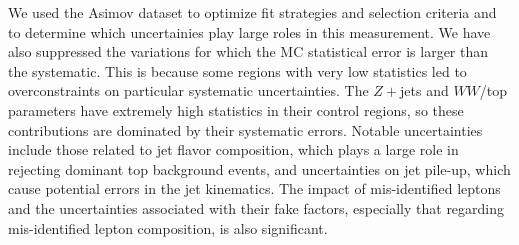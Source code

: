 
We used the Asimov dataset to optimize fit strategies and selection criteria and to determine which uncertainies play large roles in this measurement. We have also suppressed the variations for which the MC statistical error is larger than the systematic. This is because some regions with very low statistics led to overconstraints on particular systematic uncertainties. The $Z+$jets and $WW$/top parameters have extremely high statistics in their control regions, so these contributions are dominated by their systematic errors. Notable uncertainties include those related to jet flavor composition, which plays a large role in rejecting dominant top background events, and uncertainties on jet pile-up, which cause potential errors in the jet kinematics. The impact of mis-identified leptons and the uncertainties associated with their fake factors, especially that regarding mis-identified lepton composition, is also significant.

